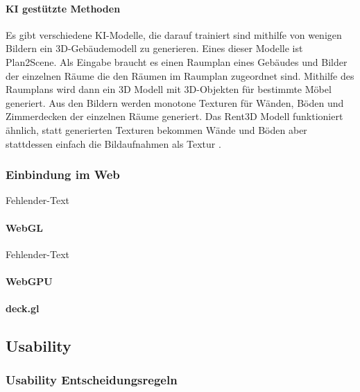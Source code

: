 \paragraph{KI gestützte Methoden}
Es gibt verschiedene KI-Modelle, die darauf trainiert sind mithilfe von wenigen Bildern ein 3D-Gebäudemodell zu generieren. Eines dieser Modelle ist Plan2Scene. Als Eingabe braucht es einen Raumplan eines Gebäudes und Bilder der einzelnen Räume die den Räumen im Raumplan zugeordnet sind. Mithilfe des Raumplans wird dann ein 3D Modell mit 3D-Objekten für bestimmte Möbel generiert. Aus den Bildern werden monotone Texturen für Wänden, Böden und Zimmerdecken der einzelnen Räume generiert.\cite[S.~10733]{Plan2Scene2021} Das Rent3D Modell funktioniert ähnlich, statt generierten Texturen bekommen Wände und Böden aber stattdessen einfach die Bildaufnahmen als Textur \cite[S.~3413]{Rent3D2015}.

\subsubsection{Einbindung im Web}
Fehlender-Text

\paragraph{WebGL}
Fehlender-Text

\paragraph{WebGPU}

\paragraph{deck.gl}

\subsection{Usability}

\subsubsection{Usability Entscheidungsregeln}

